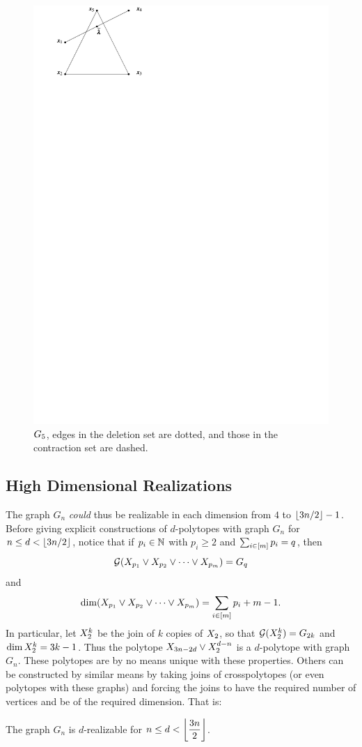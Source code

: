        \begin{figure}[h!bt]
            \centering
                \includegraphics[width=.7\textwidth, page=31]{pictures.pdf}
            \caption{\protect$G_5\protect$, edges in the deletion set are dotted, and those in the contraction set are dashed.\label{Fig:Xfive}}
        \end{figure}
        \subsection{High Dimensional Realizations}

            The graph \(G_n\) \emph{could} thus be realizable in each dimension from \(4\) to \(\left\lfloor3n/2\right\rfloor-1\).  Before giving explicit constructions of \(d\)-polytopes with graph \(G_n\) for \(n\le d<\left\lfloor3n/2\right\rfloor\), notice that if \(p_i\in\mathbb{N}\) with \(p_i\ge 2\) and \(\sum_{i\in\left[m\right]}p_i=q\), then
                \[
                    \mathcal{G}(X_{p_1}\vee X_{p_2}\vee\dotsb\vee X_{p_m})=G_q
                \]
            and
                \[
                    \dim(X_{p_1}\vee X_{p_2}\vee\dotsb\vee X_{p_m})=\sum_{i\in\left[m\right]}p_i+m-1.
                \]
            In particular, let \(X_{2}^k\) be the join of \(k\) copies of \(X_{2}\), so that \(\mathcal{G}(X_{2}^k)=G_{2k}\) and \(\dim X_{2}^k=3k-1\).  Thus the polytope \(X_{3n-2d}\vee X_{2}^{d-n}\) is a \(d\)-polytope with graph \(G_n\).  These polytopes are by no means unique with these properties.  Others can be constructed by similar means by taking joins of crosspolytopes (or even polytopes with these graphs) and forcing the joins to have the required number of vertices and be of the required dimension.  That is:
                \begin{Theorem}
                    The graph \(G_n\) is \(d\)-realizable for \(n\le d<\displaystyle\left\lfloor\frac{3n}2\right\rfloor\).
                \end{Theorem}
            
